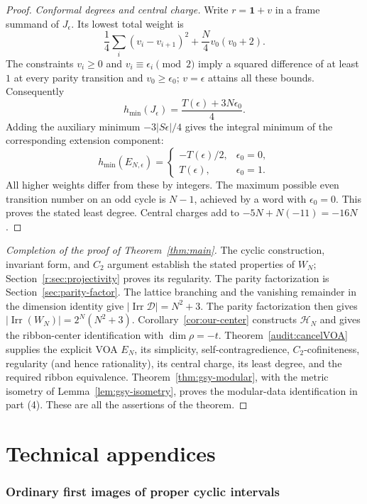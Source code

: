 \documentclass[11pt,a4paper]{article}
\numberwithin{equation}{section}
\theoremstyle{definition}\newtheorem{definition}[theorem]{Definition}
\theoremstyle{remark}\newtheorem{remark}[theorem]{Remark}
\begin{document}
\begin{proof}
\emph{Conformal degrees and central charge.}
Write $r=\mathbf1+v$ in a frame summand of $J_\epsilon$.
Its lowest total weight is
\[
 \frac14\sum_i(v_i-v_{i+1})^2+\frac N4v_0(v_0+2).
\]
The constraints $v_i\geq0$ and $v_i\equiv\epsilon_i\pmod2$
imply a squared difference of at least $1$ at every parity
transition and $v_0\geq\epsilon_0$; $v=\epsilon$ attains all
these bounds. Consequently
\[
 h_{\min}(J_\epsilon)
 =\frac{T(\epsilon)+3N\epsilon_0}{4}.
\]
Adding the auxiliary minimum $-3|S\epsilon|/4$ gives the integral
minimum of the corresponding extension component:
\[
 h_{\min}(E_{N,\epsilon})=
 \begin{cases}
 -T(\epsilon)/2,&\epsilon_0=0,\\
 T(\epsilon),&\epsilon_0=1.
 \end{cases}
\]
All higher weights differ from these by integers. The maximum
possible even transition number on an odd cycle is $N-1$, achieved
by a word with $\epsilon_0=0$.
This proves the stated least degree. Central charges add to
$-5N+N(-11)=-16N$.
\end{proof}

\begin{proof}[Completion of the proof of Theorem~\ref{thm:main}]
The cyclic construction, invariant form, and $C_2$ argument establish
the stated properties of $W_N$; Section~\ref{r:sec:projectivity}
proves its regularity. The parity factorization is
Section~\ref{sec:parity-factor}. The lattice branching and the vanishing
remainder in the dimension identity give
$|\operatorname{Irr}\mathcal D|=N^2+3$. The parity factorization
then gives $|\operatorname{Irr}(W_N)|=2^N(N^2+3)$.
Corollary~\ref{cor:our-center} constructs $\mathcal H_N$ and gives
the ribbon-center identification with $\dim\rho=-t$.
Theorem~\ref{audit:cancelVOA} supplies the explicit VOA $E_N$, its
simplicity, self-contragredience, $C_2$-cofiniteness, regularity
(and hence rationality), its central charge, its least degree, and
the required ribbon equivalence. Theorem~\ref{thm:gsy-modular}, with the metric
isometry of Lemma~\ref{lem:gsy-isometry}, proves the modular-data
identification in part (4). These are all the assertions of the theorem.
\end{proof}

\appendix
\part*{Technical appendices}
\section{Ordinary first images of proper cyclic intervals}
\label{v2:ordinary-appendix}
\label{neutral:app:proper-intervals}
\end{document}
